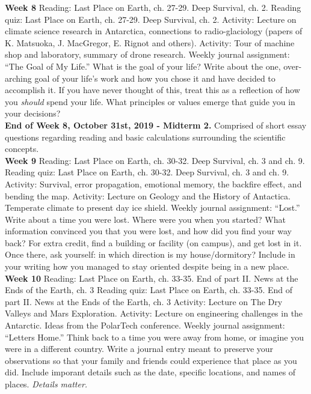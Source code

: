 \documentclass[10pt]{article}
\begin{document}
\begin{outline}[enumerate]
\1 \textbf{Week 8}
\2 Reading: Last Place on Earth, ch. 27-29.  Deep Survival, ch. 2.
\2 Reading quiz:  Last Place on Earth, ch. 27-29.  Deep Survival, ch. 2.
\2 Activity: Lecture on climate science research in Antarctica, connections to radio-glaciology (papers of K. Matsuoka, J. MacGregor, E. Rignot and others).
\2 Activity: Tour of machine shop and laboratory, summary of drone research.
\2 Weekly journal assignment: ``The Goal of My Life.'' What is the goal of your life?  Write about the one, over-arching goal of your life's work and how you chose it and have decided to accomplish it.  If you have never thought of this, treat this as a reflection of how you \textit{should} spend your life.  What principles or values emerge that guide you in your decisions? \\
\1 \textbf{End of Week 8, October 31st, 2019 - Midterm 2.} Comprised of short essay questions regarding reading and basic calculations surrounding the scientific concepts. \\
\1 \textbf{Week 9}
\2 Reading: Last Place on Earth, ch. 30-32. Deep Survival, ch. 3 and ch. 9.
\2 Reading quiz: Last Place on Earth, ch. 30-32. Deep Survival, ch. 3 and ch. 9.
\2 Activity: Survival, error propagation, emotional memory, the backfire effect, and bending the map.
\2 Activity: Lecture on Geology and the History of Antactica.  Temperate climate to present day ice shield.
\2 Weekly journal assignment: ``Lost.'' Write about a time you were lost.  Where were you when you started?  What information convinced you that you were lost, and how did you find your way back?  For extra credit, find a building or facility (on campus), and get lost in it.  Once there, ask yourself: in which direction is my house/dormitory?  Include in your writing how you managed to stay oriented despite being in a new place. \\
\1 \textbf{Week 10}
\2 Reading: Last Place on Earth, ch. 33-35. End of part II.  News at the Ends of the Earth, ch. 3
\2 Reading quiz: Last Place on Earth, ch. 33-35. End of part II.  News at the Ends of the Earth, ch. 3
\2 Activity: Lecture on The Dry Valleys and Mars Exploration.
\2 Activity: Lecture on engineering challenges in the Antarctic.  Ideas from the PolarTech conference.
\2 Weekly journal assignment: ``Letters Home.'' Think back to a time you were away from home, or imagine you were in a different country.  Write a journal entry meant to preserve your observations so that your family and friends could experience that place as you did.  Include imporant details such as the date, specific locations, and names of places.  \textit{Details matter.} \\

\end{outline}
\end{document}
